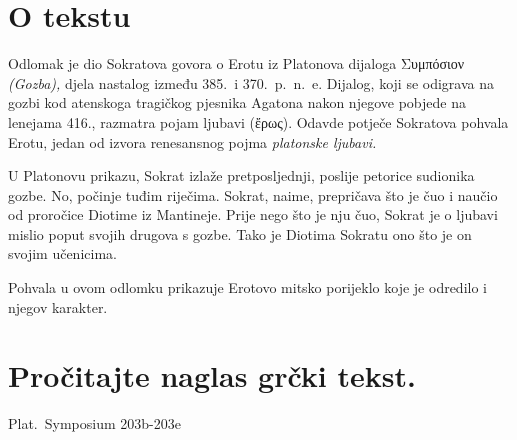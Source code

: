 


\section*{O tekstu}

Odlomak je dio Sokratova govora o Erotu iz Platonova dijaloga \textgreek[variant=ancient]{Συμπόσιον} \textit{(Gozba),} djela nastalog između 385.\ i 370.\ p.~n.~e. Dijalog, koji se odigrava na gozbi kod atenskoga tragičkog pjesnika Agatona nakon njegove pobjede na lenejama 416., razmatra pojam ljubavi \textgreek[variant=ancient]{(ἔρως).} Odavde potječe Sokratova pohvala Erotu, jedan od izvora renesansnog pojma \textit{platonske ljubavi.}

U Platonovu prikazu, Sokrat izlaže pretposljednji, poslije petorice sudionika gozbe. No, počinje tuđim riječima. Sokrat, naime, prepričava što je čuo i naučio od proročice Diotime iz Mantineje. Prije nego što je nju čuo, Sokrat je o ljubavi mislio poput svojih drugova s gozbe. Tako je Diotima Sokratu ono što je on svojim učenicima.

Pohvala u ovom odlomku prikazuje Erotovo mitsko porijeklo koje je odredilo i njegov karakter.



\section*{Pročitajte naglas grčki tekst.}

Plat.\ Symposium 203b-203e


\medskip



